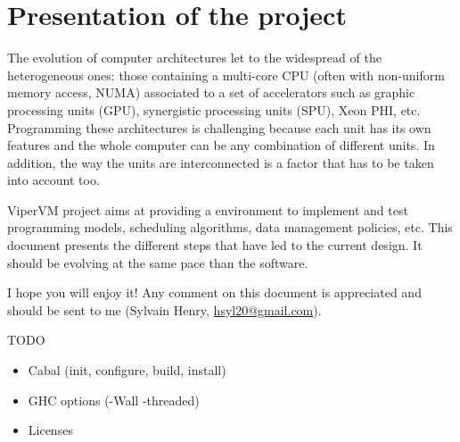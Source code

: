 \chapter{Presentation of the project}

The evolution of computer architectures let to the widespread of the
heterogeneous ones: those containing a multi-core CPU (often with non-uniform
memory access, NUMA) associated to a set of accelerators such as graphic
processing units (GPU), synergistic processing units (SPU), Xeon PHI, etc.
Programming these architectures is challenging because each unit has its own
features and the whole computer can be any combination of different units. In
addition, the way the units are interconnected is a factor that has to be taken
into account too.

ViperVM project aims at providing a environment to implement and test programming
models, scheduling algorithms, data management policies, etc. This document
presents the different steps that have led to the current design. It should be
evolving at the same pace than the software. 

I hope you will enjoy it! Any comment on this document is appreciated and should
be sent to me (Sylvain Henry, \url{hsyl20@gmail.com}).

\vfill
TODO
\begin{itemize}
   \item Cabal (init, configure, build, install)
   \item GHC options (-Wall -threaded)
   \item Licenses
\end{itemize}
